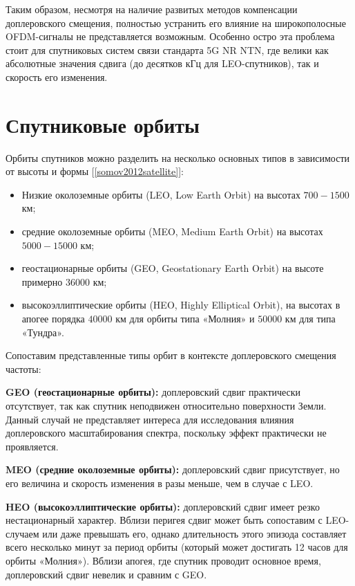 Таким образом, несмотря на наличие развитых методов компенсации доплеровского смещения,
полностью устранить его влияние на широкополос\-ные OFDM-сигналы не представляется возможным.
Особенно остро эта проблема стоит для спутниковых систем связи стандарта 5G NR NTN, 
где велики как абсолютные значения сдвига (до десятков кГц для LEO-спутников), 
так и скорость его изменения. 


\section{Спутниковые орбиты}

Орбиты спутников можно разделить на несколько основных типов в зависимости от высоты и формы [\ref{somov2012satellite}]:
\begin{itemize}
    \item Низкие околоземные орбиты (LEO, Low Earth Orbit) на высотах $700 - 1500$ км;
    \item средние околоземные орбиты (MEO, Medium Earth Orbit) на высотах $5000 - 15000$ км; 
    \item геостационарные орбиты (GEO, Geostationary Earth Orbit) на высоте примерно $36000$ км;
    \item высокоэллиптические орбиты (HEO, Highly Elliptical Orbit), на высотах в апогее порядка $40000$ км для 
    орбиты типа «Молния» и $50000$ км для типа «Тундра».
\end{itemize}

Сопоставим представленные типы орбит в контексте доплеровского смещения частоты:

\textbf{GEO (геостационарные орбиты):} 
доплеровский сдвиг практически отсутствует, так как спутник неподвижен относительно поверхности Земли.
Данный случай не представляет интереса для исследования влияния доплеровского масштабирования спектра,
поскольку эффект практически не проявляется.

\textbf{MEO (средние околоземные орбиты):} доплеровский сдвиг присутствует,
но его величина и скорость изменения в разы меньше, чем в случае с LEO.

\textbf{HEO (высокоэллиптические орбиты):} доплеровский сдвиг имеет резко нестационарный характер. 
Вблизи перигея сдвиг может быть сопоставим с LEO-случаем или даже превышать его, 
однако длительность этого эпизода составляет всего несколько минут за период орбиты 
(который может достигать 12 часов для орбиты «Молния»). Вблизи апогея, где спутник проводит 
основное время, доплеровский сдвиг невелик и сравним с GEO.

